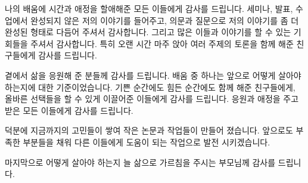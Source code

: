 \documentclass[oneside, ko,phd]{snuthesis_utf8_kor}
\begin{document}
나의 배움에 시간과 애정을 할애해준 모든 이들에게 감사를 드립니다.
세미나, 발표, 수업에서 완성되지 않은 저의 이야기를 들어주고, 의문과 질문으로 저의 이야기를 좀 더 완성된 형태로 다듬어 주셔서 감사합니다.
그리고 많은 이들과 이야기를 할 수 있는 기회들을 주셔서 감사합니다.
특히 오랜 시간 마주 앉아 여러 주제의 토론을 함께 해준 친구들에게 감사를 드립니다.

곁에서 삶을 응원해 준 분들께 감사를 드립니다.
배움 중 하나는 앞으로 어떻게 살아야 하는지에 대한 기준이었습니다.
기쁜 순간에도 힘든 순간에도 함께 해준 친구들에게, 올바른 선택들을 할 수 있게 이끌어준 이들에게 감사를 드립니다.
응원과 애정을 주고 받은 모든 이들에게 감사를 드립니다.

덕분에 지금까지의 고민들이 쌓여 작은 논문과 작업들이 만들어 졌습니다.
앞으로도 부족한 부분들을 채워 다른 이들에게 도움이 되는 작업으로 발전 시키겠습니다.

마지막으로 어떻게 살아야 하는지 늘 삶으로 가르침을 주시는 부모님께 감사를 드립니다.
\end{document}
